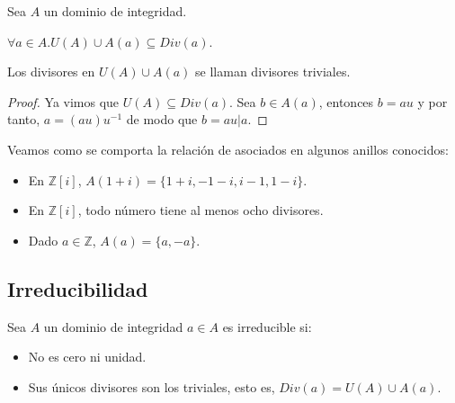 \begin{proposition}
Sea $A$ un dominio de integridad. 

$\forall a \in A. U(A) \cup A(a) \subseteq Div(a)$. 

Los divisores en $U(A) \cup A(a)$ se llaman divisores triviales. 
\end{proposition}
\begin{proof}
Ya vimos que $U(A) \subseteq Div(a)$. Sea $b \in A(a)$, entonces $b = au$ y por tanto, $a = (au)u^{-1}$ de modo que $b = au|a$. 
\end{proof}

\begin{example}
Veamos como se comporta la relación de asociados en algunos anillos conocidos:

\begin{itemize}
\item En $\mathbb{Z}[i]$, $A(1+i) = \{1+i,-1-i,i-1,1-i\}$.
\item En $\mathbb{Z}[i]$, todo número tiene al menos ocho divisores. 
\item Dado $a \in \mathbb{Z}$, $A(a) = \{a,-a\}$.
\end{itemize}
\end{example}

\subsection{Irreducibilidad}

\begin{definition}
Sea $A$ un dominio de integridad $a \in A$ es irreducible si:

\begin{itemize}
\item No es cero ni unidad. 
\item Sus únicos divisores son los triviales, esto es, $Div(a) = U(A) \cup A(a)$. 
\end{itemize}
\end{definition}

